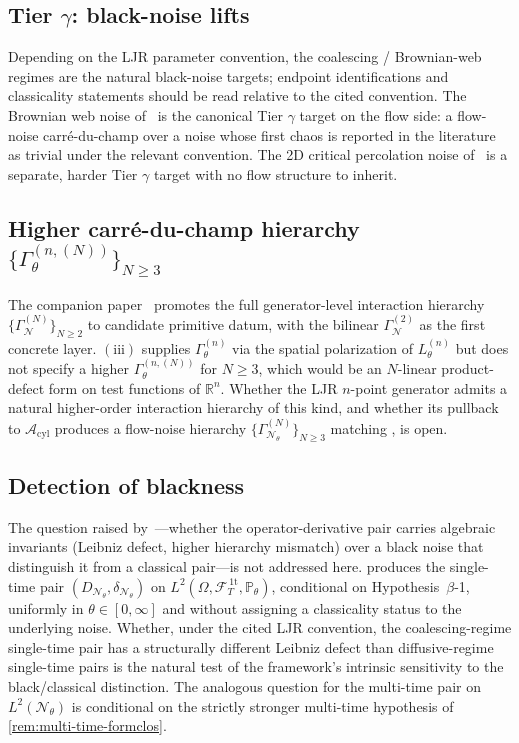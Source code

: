 \documentclass[11pt,reqno]{amsart}
\theoremstyle{plain}
\theoremstyle{definition}
\theoremstyle{remark}
\newcommand{\R}{\mathbb R}
\newcommand{\Prob}{\mathbb P}
\newcommand{\cA}{\mathcal A}
\newcommand{\cF}{\mathcal F}
\newcommand{\cN}{\mathcal N}
\newcommand{\Acyl}{\cA_{\mathrm{cyl}}}
\newcommand{\FT}{\cF_{T}^{\,\mathrm{1t}}}
\newcommand{\Hone}{L^{2}(\Omega,\FT,\Pth)}
\newcommand{\GamM}[1]{\Gamma^{(#1)}_{\theta}}
\newcommand{\Lth}[1]{L^{(#1)}_{\theta}}
\newcommand{\DN}{D_{\cN_{\theta}}}
\newcommand{\divN}{\delta_{\cN_{\theta}}}
\newcommand{\Pth}{\Prob_{\theta}}
\begin{document}
\subsection{Tier \texorpdfstring{$\gamma$}{gamma}: black-noise lifts}\label{sec:open-tier-gamma}

Depending on the LJR parameter convention, the coalescing /
Brownian-web regimes are the natural black-noise targets;
endpoint identifications and classicality statements should be
read relative to the cited convention. The Brownian web noise
of~\cite[\S 7]{Tsirelson2004,SchertzerSunSwart} is the canonical
Tier $\gamma$ target on the flow side: a flow-noise
carr\'e-du-champ over a noise whose first chaos is reported in the
literature as trivial under the relevant convention. The 2D
critical percolation noise of~\cite{SchrammSmirnov2011} is a
separate, harder Tier $\gamma$ target with no flow structure to
inherit.

\subsection{Higher carr\'e-du-champ hierarchy
\texorpdfstring{$\{\GamM{n,(N)}\}_{N\ge 3}$}{higher Gamma N}}\label{sec:open-hierarchy}

The companion paper~\cite[\S 6]{PrimitiveDivergence} promotes the
full generator-level interaction hierarchy
$\{\Gamma_{\cN}^{(N)}\}_{N\ge 2}$ to candidate primitive datum, with
the bilinear $\Gamma_{\cN}^{(2)}$ as the first concrete layer.
$(\mathrm{iii})$ supplies $\GamM{n}$ via the
spatial polarization of $\Lth{n}$ but does not specify a higher
$\GamM{n,(N)}$ for $N\ge 3$, which would be an $N$-linear
product-defect form on test functions of $\R^{n}$. Whether the LJR
$n$-point generator admits a natural higher-order interaction
hierarchy of this kind, and whether its pullback to $\Acyl$
produces a flow-noise hierarchy
$\{\Gamma_{\cN_{\theta}}^{(N)}\}_{N\ge 3}$ matching
\cite[\S 6]{PrimitiveDivergence}, is open.

\subsection{Detection of blackness}\label{sec:open-blackness}

The question raised by~\cite[\S 4]{OperatorDerivative}---whether the
operator-derivative pair carries algebraic invariants
(Leibniz defect, higher hierarchy mismatch) over a black noise that
distinguish it from a classical pair---is not addressed here.
 produces the single-time pair $(\DN,\divN)$
on $\Hone$, conditional on Hypothesis~$\beta$-1, uniformly in
$\theta\in[0,\infty]$ and without assigning a classicality status
to the underlying noise. Whether, under the cited LJR convention,
the coalescing-regime single-time pair has a structurally different
Leibniz defect than diffusive-regime single-time pairs is the
natural test of the framework's intrinsic sensitivity to the
black/classical distinction. The analogous question for the
multi-time pair on $L^{2}(\cN_{\theta})$ is conditional on the
strictly stronger multi-time hypothesis of
\cref{rem:multi-time-formclos}.
\end{document}
